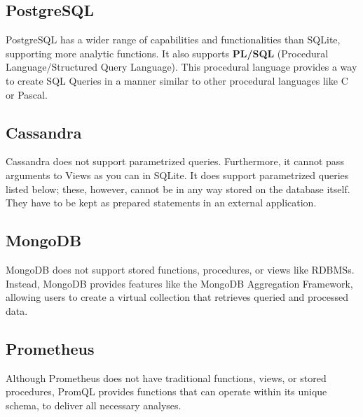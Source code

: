 \subsection{PostgreSQL}
\par PostgreSQL has a wider range of capabilities and functionalities than SQLite, supporting more analytic functions. It also supports \textbf{PL/SQL} (Procedural Language/Structured Query Language). This procedural language provides a way to create SQL Queries in a manner similar to other procedural languages like C or Pascal. 


\subsection{Cassandra}
\par Cassandra does not support parametrized queries. Furthermore, it cannot pass arguments to Views as you can in SQLite. It does support parametrized queries listed below; these, however, cannot be in any way stored on the database itself. They have to be kept as prepared statements in an external application.


\subsection{MongoDB}
\par MongoDB does not support stored functions, procedures, or views like RDBMSs. Instead, MongoDB provides features like the MongoDB Aggregation Framework, allowing users to create a virtual collection that retrieves queried and processed data. 


\subsection{Prometheus}
\par Although Prometheus does not have traditional functions, views, or stored procedures, PromQL provides functions that can operate within its unique schema, to deliver all necessary analyses. 

